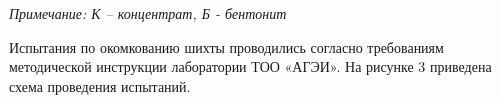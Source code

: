 
\emph{Примечание: К -- концентрат, Б - бентонит}

Испытания по окомкованию шихты проводились согласно требованиям
методической инструкции лаборатории ТОО «АГЭИ». На рисунке 3 приведена
схема проведения испытаний.



